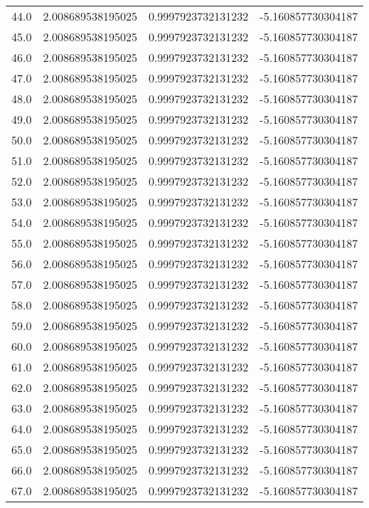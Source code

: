 \begin{longtable}{lrrr}
44.0 & 2.008689538195025 & 0.9997923732131232 & -5.160857730304187 \\
45.0 & 2.008689538195025 & 0.9997923732131232 & -5.160857730304187 \\
46.0 & 2.008689538195025 & 0.9997923732131232 & -5.160857730304187 \\
47.0 & 2.008689538195025 & 0.9997923732131232 & -5.160857730304187 \\
48.0 & 2.008689538195025 & 0.9997923732131232 & -5.160857730304187 \\
49.0 & 2.008689538195025 & 0.9997923732131232 & -5.160857730304187 \\
50.0 & 2.008689538195025 & 0.9997923732131232 & -5.160857730304187 \\
51.0 & 2.008689538195025 & 0.9997923732131232 & -5.160857730304187 \\
52.0 & 2.008689538195025 & 0.9997923732131232 & -5.160857730304187 \\
53.0 & 2.008689538195025 & 0.9997923732131232 & -5.160857730304187 \\
54.0 & 2.008689538195025 & 0.9997923732131232 & -5.160857730304187 \\
55.0 & 2.008689538195025 & 0.9997923732131232 & -5.160857730304187 \\
56.0 & 2.008689538195025 & 0.9997923732131232 & -5.160857730304187 \\
57.0 & 2.008689538195025 & 0.9997923732131232 & -5.160857730304187 \\
58.0 & 2.008689538195025 & 0.9997923732131232 & -5.160857730304187 \\
59.0 & 2.008689538195025 & 0.9997923732131232 & -5.160857730304187 \\
60.0 & 2.008689538195025 & 0.9997923732131232 & -5.160857730304187 \\
61.0 & 2.008689538195025 & 0.9997923732131232 & -5.160857730304187 \\
62.0 & 2.008689538195025 & 0.9997923732131232 & -5.160857730304187 \\
63.0 & 2.008689538195025 & 0.9997923732131232 & -5.160857730304187 \\
64.0 & 2.008689538195025 & 0.9997923732131232 & -5.160857730304187 \\
65.0 & 2.008689538195025 & 0.9997923732131232 & -5.160857730304187 \\
66.0 & 2.008689538195025 & 0.9997923732131232 & -5.160857730304187 \\
67.0 & 2.008689538195025 & 0.9997923732131232 & -5.160857730304187 \\

\end{longtable}
